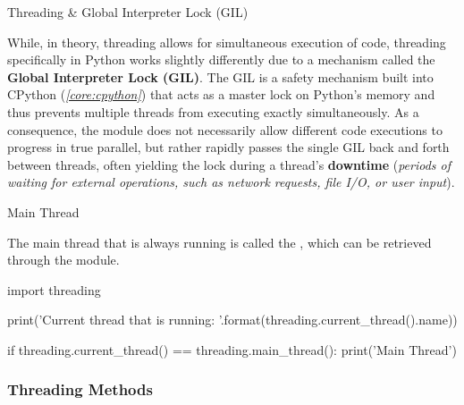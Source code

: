 \documentclass[10pt]{article}
\begin{document}
    \begin{core}{Threading \& Global Interpreter Lock (GIL)}

      While, in theory, threading allows for simultaneous execution of code, threading specifically in Python works slightly differently due to a mechanism called the \textbf{Global Interpreter Lock (GIL)}. The GIL is a safety mechanism built into CPython (\textit{\autoref{core:cpython}}) that acts as a master lock on Python's memory and thus prevents multiple threads from executing exactly simultaneously. As a consequence, the  module does not necessarily allow different code executions to progress in true parallel, but rather rapidly passes the single GIL back and forth between threads, often yielding the lock during a thread's \textbf{downtime} (\textit{periods of waiting for external operations, such as network requests, file I/O, or user input}).

    \end{core}

    \begin{core}{Main Thread}

      The main thread that is always running is called the , which can be retrieved through the  module.

      \begin{pyconsole}

        import threading

        print('Current thread that is running: {}'.format(threading.current_thread().name))

        if threading.current_thread() == threading.main_thread():
            print('Main Thread')

      \end{pyconsole}

    \end{core}

    \subsubsection{Threading Methods}
\end{document}
